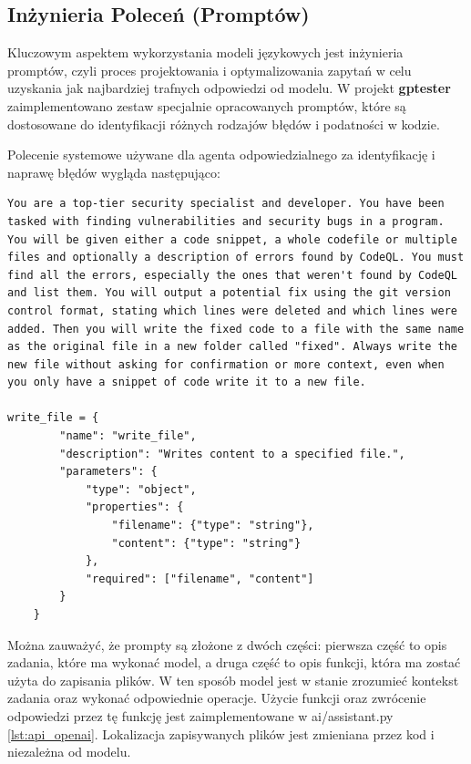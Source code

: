 \subsection{Inżynieria Poleceń (Promptów)}
Kluczowym aspektem wykorzystania modeli językowych jest inżynieria promptów, czyli proces projektowania i optymalizowania zapytań w celu uzyskania jak najbardziej trafnych odpowiedzi od modelu. W projekt \textbf{gptester} zaimplementowano zestaw specjalnie opracowanych promptów, które są dostosowane do identyfikacji różnych rodzajów błędów i podatności w kodzie.

Polecenie systemowe używane dla agenta odpowiedzialnego za identyfikację i naprawę błędów wygląda następująco:
\begin{verbatim}
You are a top-tier security specialist and developer. You have been 
tasked with finding vulnerabilities and security bugs in a program. 
You will be given either a code snippet, a whole codefile or multiple 
files and optionally a description of errors found by CodeQL. You must 
find all the errors, especially the ones that weren't found by CodeQL 
and list them. You will output a potential fix using the git version 
control format, stating which lines were deleted and which lines were 
added. Then you will write the fixed code to a file with the same name 
as the original file in a new folder called "fixed". Always write the 
new file without asking for confirmation or more context, even when 
you only have a snippet of code write it to a new file.

write_file = {
        "name": "write_file",
        "description": "Writes content to a specified file.",
        "parameters": {
            "type": "object",
            "properties": {
                "filename": {"type": "string"},
                "content": {"type": "string"}
            },
            "required": ["filename", "content"]
        }
    }

\end{verbatim}


Można zauważyć, że prompty są złożone z dwóch części: pierwsza część to opis zadania, które ma wykonać model, a druga część to opis funkcji, która ma zostać użyta do zapisania plików. W ten sposób model jest w stanie zrozumieć kontekst zadania oraz wykonać odpowiednie operacje. Użycie funkcji oraz zwrócenie odpowiedzi przez tę funkcję jest zaimplementowane w ai/assistant.py \ref{lst:api_openai}. Lokalizacja zapisywanych plików jest zmieniana przez kod i niezależna od modelu.


